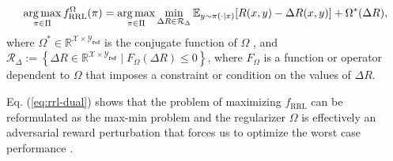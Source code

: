 \begin{equation}
\begin{aligned}
\argmax_{\pi \in \Pi} f_\textrm{RRL}^\Omega(\pi)%
&=\argmax_{\pi \in \Pi} \min _{\Delta R \in \mathcal{R}_{\Delta}}\mathbb{E}_{y \sim \pi(\cdot \mid x)}[R(x,y)-\Delta R(x,y)]+\Omega^{*}(\Delta R), \label{eq:rrl-dual}\\
\end{aligned}
\end{equation}
where $\Omega^* \in \mathbb{R}^{\mathcal{X} \times\mathcal{Y}_{\textbf{ref}}}$ is the conjugate function of $\Omega$ \citep{boyd2004convex}, and $\mathcal{R}_{\Delta}:=\left\{\Delta R \in \mathbb{R}^{\mathcal{X} \times \mathcal{Y}_{\textbf{ref}}} \mid F_{\Omega}(\Delta R) \leq 0\right\}$, where $F_{\Omega}$ is a function or operator dependent to $\Omega$ that imposes a constraint or condition on the values of $\Delta R$. 







Eq. (\ref{eq:rrl-dual}) shows that the problem of maximizing $f_\textrm{RRL}$ can be reformulated as the max-min problem and the regularizer $\Omega$ is effectively an adversarial reward perturbation that forces us to optimize the worst case performance \citep{NEURIPS2021_bb1443cc}.

